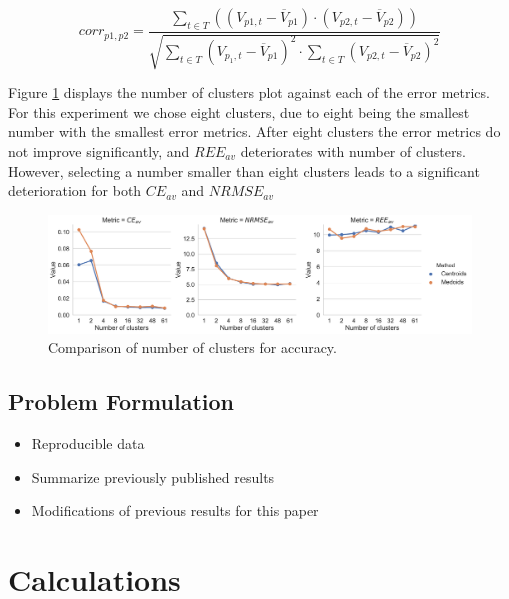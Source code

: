 \documentclass[final,3p,times,twocolumn,numbers]{elsarticle}
\begin{document}
\begin{equation}
	corr_{p1,p2}=\frac
	{\sum\limits_{t\in T}\left(\left(V_{p1,t}-\overline{V}_{p1}\right)\cdot\left(V_{p2,t}-\overline{V}_{p2}\right)\right)}
	{\sqrt{
	\sum\limits_{t\in T} \left(V_{p_1,t}-\overline{V}_{p1}\right)^2\cdot\sum\limits_{t\in T}\left(V_{p2,t}-\overline{V}_{p2}\right)^2
	}}
\end{equation}

Figure \ref{fig:clusters_compared} displays the number of clusters plot against each of the error metrics. For this experiment we chose eight clusters, due to eight being the smallest number with the smallest error metrics. After eight clusters the error metrics do not improve significantly, and $REE_{av}$ deteriorates with number of clusters. However, selecting a number smaller than eight clusters leads to a significant deterioration for both $CE_{av}$ and $NRMSE_{av}$


\begin{figure}
\centering
\includegraphics[width=\textwidth]{figures/methods_and_materials/clusters_compared.pdf}
\caption{Comparison of number of clusters for accuracy.}
\label{fig:clusters_compared}
\end{figure}
 
\subsection{Problem Formulation}




\begin{itemize}
	\item Reproducible data
	\item Summarize previously published results
	\item Modifications of previous results for this paper
\end{itemize}

\section{Calculations}
\label{sec:calculations}
\end{document}
